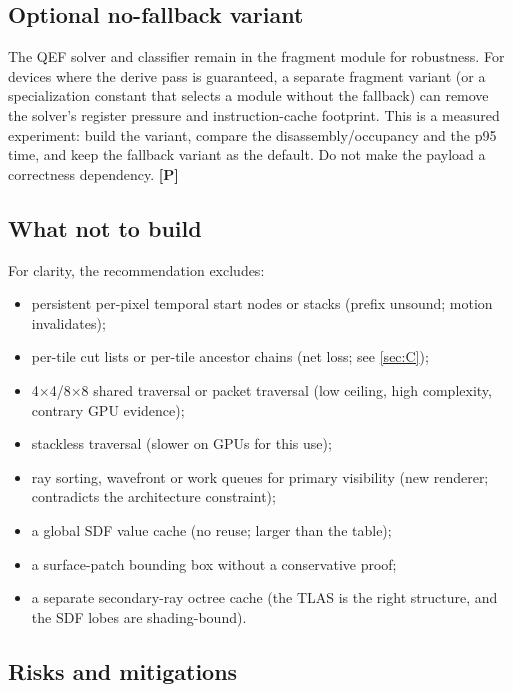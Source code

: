 \documentclass[11pt,a4paper]{article}
\newcommand{\evP}{\textsf{\textbf{\color{evP}[P]}}}
\theoremstyle{plain}
\theoremstyle{definition}
\theoremstyle{remark}
\begin{document}
\subsection{Optional no-fallback variant}

The QEF solver and classifier remain in the fragment module for robustness.
For devices where the derive pass is guaranteed, a separate fragment variant
(or a specialization constant that selects a module without the fallback) can
remove the solver's register pressure and instruction-cache footprint. This is
a measured experiment: build the variant, compare the disassembly/occupancy
and the p95 time, and keep the fallback variant as the default. Do not make the
payload a correctness dependency. \evP

\subsection{What not to build}

For clarity, the recommendation excludes:
\begin{itemize}[leftmargin=1.3em,itemsep=1pt]
\item persistent per-pixel temporal start nodes or stacks (prefix unsound;
      motion invalidates);
\item per-tile cut lists or per-tile ancestor chains (net loss; see
      \cref{sec:C});
\item 4$\times$4/8$\times$8 shared traversal or packet traversal (low ceiling,
      high complexity, contrary GPU evidence);
\item stackless traversal (slower on GPUs for this use);
\item ray sorting, wavefront or work queues for primary visibility (new
      renderer; contradicts the architecture constraint);
\item a global SDF value cache (no reuse; larger than the table);
\item a surface-patch bounding box without a conservative proof;
\item a separate secondary-ray octree cache (the TLAS is the right structure,
      and the SDF lobes are shading-bound).
\end{itemize}

\subsection{Risks and mitigations}
\end{document}
